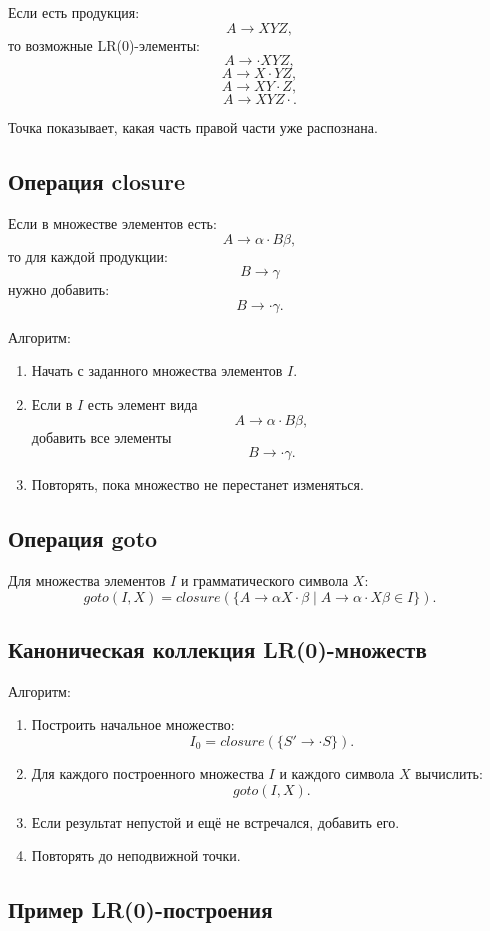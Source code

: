 \documentclass[12pt,a4paper]{article}
\theoremstyle{definition}
\theoremstyle{plain}
\begin{document}
Если есть продукция:
\[
A\to XYZ,
\]
то возможные LR(0)-элементы:
\[
A\to \cdot XYZ,
\]
\[
A\to X\cdot YZ,
\]
\[
A\to XY\cdot Z,
\]
\[
A\to XYZ\cdot.
\]

Точка показывает, какая часть правой части уже распознана.

\subsection{Операция closure}

Если в множестве элементов есть:
\[
A\to \alpha\cdot B\beta,
\]
то для каждой продукции:
\[
B\to \gamma
\]
нужно добавить:
\[
B\to \cdot\gamma.
\]

Алгоритм:
\begin{enumerate}
    \item Начать с заданного множества элементов $I$.
    \item Если в $I$ есть элемент вида
    \[
    A\to \alpha\cdot B\beta,
    \]
    добавить все элементы
    \[
    B\to \cdot\gamma.
    \]
    \item Повторять, пока множество не перестанет изменяться.
\end{enumerate}

\subsection{Операция goto}

Для множества элементов $I$ и грамматического символа $X$:
\[
goto(I,X)=closure(\{A\to \alpha X\cdot \beta \mid A\to \alpha\cdot X\beta\in I\}).
\]

\subsection{Каноническая коллекция LR(0)-множеств}

Алгоритм:
\begin{enumerate}
    \item Построить начальное множество:
    \[
    I_0=closure(\{S'\to \cdot S\}).
    \]
    \item Для каждого построенного множества $I$ и каждого символа $X$ вычислить:
    \[
    goto(I,X).
    \]
    \item Если результат непустой и ещё не встречался, добавить его.
    \item Повторять до неподвижной точки.
\end{enumerate}

\subsection{Пример LR(0)-построения}
\end{document}

